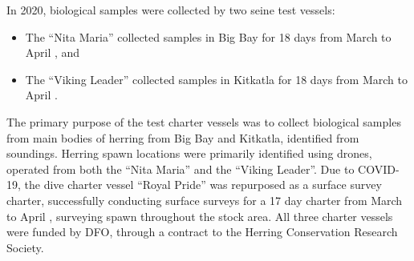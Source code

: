In 2020, biological samples were collected by two seine test vessels:
\begin{itemize}
\item The ``Nita Maria'' collected samples in Big Bay for 18 days from March  to April , and
\item The ``Viking Leader'' collected samples in Kitkatla for 18 days from March  to April .
\end{itemize}
The primary purpose of the test charter vessels was to collect biological samples from main bodies of herring from Big Bay and Kitkatla, identified from soundings.
Herring spawn locations were primarily identified using drones, operated from both the ``Nita Maria'' and the ``Viking Leader''.
Due to COVID-19, the dive charter vessel ``Royal Pride'' was repurposed as a surface survey charter,
successfully conducting surface surveys for a 17 day charter from March  to April ,
surveying spawn throughout the stock area.
All three charter vessels were funded by DFO, through a contract to the Herring Conservation Research Society.